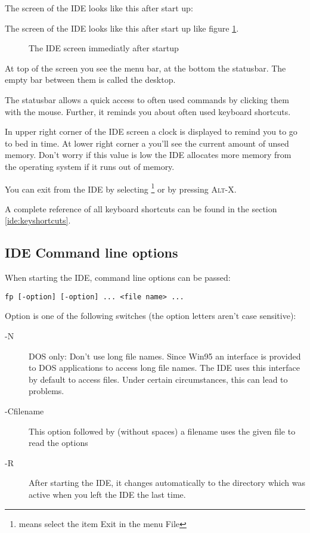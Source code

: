 \begin{htmlonly}
The screen of the IDE looks like this after start up:
\end{htmlonly}
\begin{latexonly}
The screen of the IDE looks like this after start up like figure \ref{fig:idestart}.
\begin{figure}
\caption{The IDE screen immediatly after startup}
\label{fig:idestart}
\ifpdf
{}
\else
{}
\fi
\end{figure}
\end{latexonly}
At top of the screen you see the menu bar, at the bottom the statusbar.
The empty bar between them is called the desktop.

The statusbar allows a quick access to often used commands by
clicking them with the mouse. Further, it reminds you about often used
keyboard shortcuts.

In upper right corner of the IDE screen a clock is displayed to
remind you to go to bed in time. At lower right corner a you'll
see the current amount of unsed memory. Don't worry if this value
is low the IDE allocates more memory from the operating system
if it runs out of memory.

You can exit from the IDE by selecting 
\footnote{ means select the item Exit in the menu File}
or by pressing \textsc{Alt-X}.

\begin{remark}
A complete reference of all keyboard shortcuts can be found in the
section \ref{ide:keyshortcuts}.
\end{remark}

\subsection{IDE Command line options}

When starting the IDE, command line options can be passed:
\begin{verbatim}
fp [-option] [-option] ... <file name> ...
\end{verbatim}

Option is one of the following switches (the option letters
aren't case sensitive):

\begin{description}
\item [-N] DOS only: Don't use long file names. Since Win95 an interface
is provided to DOS applications to access long file names. The IDE uses
this interface by default to access files. Under certain circumstances, this
can lead to problems.
\item [-Cfilename] This option followed by (without spaces)
a filename uses the given file to read the options
\item [-R] After starting the IDE, it changes automatically to the directory
which was active when you left the IDE the last time.
\end{description}

